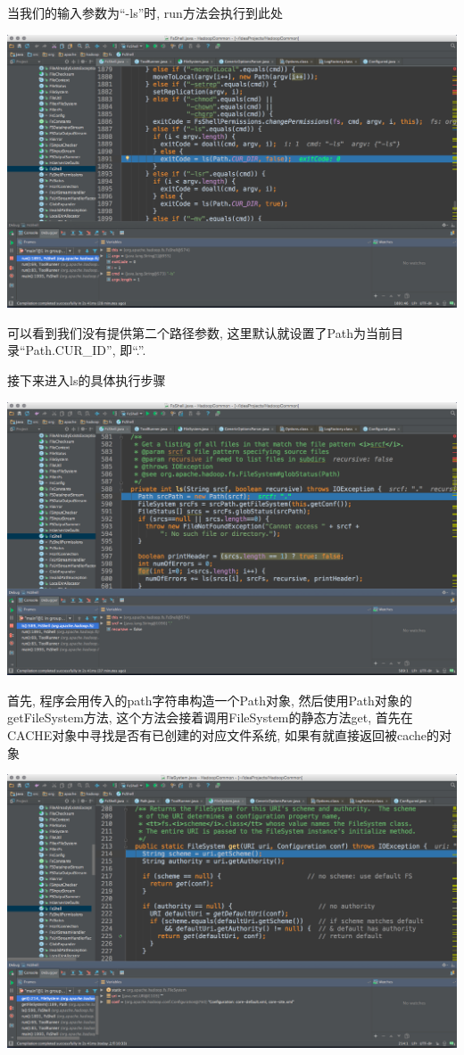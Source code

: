 当我们的输入参数为``-ls''时, run方法会执行到此处

\includegraphics[width=\textwidth]{image/env/cr36.png}

可以看到我们没有提供第二个路径参数,
这里默认就设置了Path为当前目录``Path.CUR\_{}ID'', 即``.''.

接下来进入ls的具体执行步骤

\includegraphics[width=\textwidth]{image/env/cr37.png}

首先, 程序会用传入的path字符串构造一个Path对象, 然后使用Path对象的getFileSystem方法,
这个方法会接着调用FileSystem的静态方法get, 首先在CACHE对象中寻找是否有已创建的对应文件系统,
如果有就直接返回被cache的对象

\includegraphics[width=\textwidth]{image/env/cr38.png}

